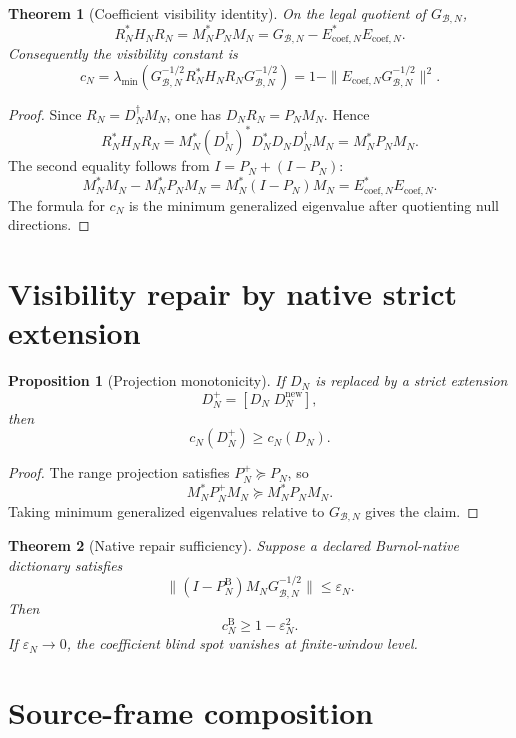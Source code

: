 \documentclass[11pt]{article}
\newtheorem{theorem}{Theorem}
\newtheorem{proposition}{Proposition}
\begin{document}
\begin{theorem}[Coefficient visibility identity]
On the legal quotient of \(G_{\mathcal B,N}\),
\[
R_N^*H_NR_N
=
M_N^*P_NM_N
=
G_{\mathcal B,N}-E_{\mathrm{coef},N}^*E_{\mathrm{coef},N}.
\]
Consequently the visibility constant is
\[
c_N
=
\lambda_{\min}\!\left(
G_{\mathcal B,N}^{-1/2}R_N^*H_NR_NG_{\mathcal B,N}^{-1/2}
\right)
=
1-\|E_{\mathrm{coef},N}G_{\mathcal B,N}^{-1/2}\|^2.
\]
\end{theorem}

\begin{proof}
Since \(R_N=D_N^\dagger M_N\), one has \(D_NR_N=P_NM_N\).  Hence
\[
R_N^*H_NR_N
=
M_N^*(D_N^\dagger)^*D_N^*D_ND_N^\dagger M_N
=
M_N^*P_NM_N.
\]
The second equality follows from \(I=P_N+(I-P_N)\):
\[
M_N^*M_N-M_N^*P_NM_N
=
M_N^*(I-P_N)M_N
=
E_{\mathrm{coef},N}^*E_{\mathrm{coef},N}.
\]
The formula for \(c_N\) is the minimum generalized eigenvalue after quotienting
null directions.
\end{proof}

\section{Visibility repair by native strict extension}

\begin{proposition}[Projection monotonicity]
If \(D_N\) is replaced by a strict extension
\[
D_N^+=[D_N\;D_N^{\mathrm{new}}],
\]
then
\[
c_N(D_N^+)\ge c_N(D_N).
\]
\end{proposition}

\begin{proof}
The range projection satisfies \(P_N^+\succeq P_N\), so
\[
M_N^*P_N^+M_N\succeq M_N^*P_NM_N.
\]
Taking minimum generalized eigenvalues relative to \(G_{\mathcal B,N}\) gives the
claim.
\end{proof}

\begin{theorem}[Native repair sufficiency]
Suppose a declared Burnol-native dictionary satisfies
\[
\|(I-P_N^{\mathrm{B}})M_NG_{\mathcal B,N}^{-1/2}\|\le \varepsilon_N.
\]
Then
\[
c_N^{\mathrm{B}}\ge 1-\varepsilon_N^2.
\]
If \(\varepsilon_N\to0\), the coefficient blind spot vanishes at finite-window level.
\end{theorem}

\section{Source-frame composition}
\end{document}
